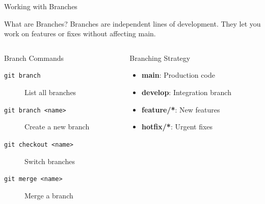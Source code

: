 \documentclass[aspectratio=169]{beamer}
\begin{document}
\begin{frame}{Working with Branches}
  \begin{block}{What are Branches?}
    Branches are independent lines of development. They let you work on features or fixes without affecting main.
  \end{block}

  \begin{columns}
    \begin{column}{0.48\textwidth}
      \begin{block}{Branch Commands}
        \begin{description}
          \item[\texttt{git branch}] List all branches
          \item[\texttt{git branch <name>}] Create a new branch
          \item[\texttt{git checkout <name>}] Switch branches
          \item[\texttt{git merge <name>}] Merge a branch
        \end{description}
      \end{block}
    \end{column}
    \begin{column}{0.48\textwidth}
      \begin{exampleblock}{Branching Strategy}
        \begin{itemize}
          \item \textbf{main}: Production code
          \item \textbf{develop}: Integration branch
          \item \textbf{feature/*}: New features
          \item \textbf{hotfix/*}: Urgent fixes
        \end{itemize}
      \end{exampleblock}
    \end{column}
  \end{columns}
\end{frame}


\end{document}
